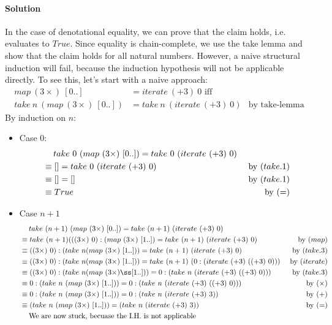 \documentclass{article}[10pt]
\begin{document}
    \paragraph{Solution}
    In the case of denotational equality, we can prove that the claim holds, i.e. evaluates to $True$.
    Since equality is chain-complete, we use the take lemma and show that the claim holds for all
    natural numbers. However, a naive structural induction will fail, because the induction hypothesis
    will not be applicable directly. To see this, let's start with a naive approach:
    \begin{align*}
      map\ (3 \times)\ [0 .. ] &= iterate\ (+3)\ 0 \text{ iff }\\
      take\ n\ (map\ (3 \times)\ [0..]) &= take\ n\ (iterate\ (+3)\ 0) &\text{by take-lemma}
    \end{align*}
    By induction on $n$:
    \begin{itemize}
      \item Case $0$:
      \begin{align*}
        &\mathbin{\hphantom{\equiv}}take\ 0\ (map\ (3 \times)\ [0..]) = take\ 0\ (iterate\ (+3)\ 0)\\
        &\equiv []                                                    = take\ 0\ (iterate\ (+3)\ 0) &\text{ by }(take.1)\\
        &\equiv []                                                    = []                          &\text{ by }(take.1)\\
        &\equiv True &\text{ by }(=)\\
      \end{align*}
      \item Case $n+1$
      \begin{align*}
        &\mathbin{\hphantom{\equiv}}take\ (n+1)\ (map\ (3 \times)\ [0..]) = take\ (n+1)\ (iterate\ (+3)\ 0)\\
        &\equiv take\ (n+1) (((3 \times)\ 0) : (map\ (3 \times)\ [1..]) =  take\ (n+1)\ (iterate\ (+3)\ 0) &\text{ by }(map)\\
        &\equiv ((3 \times)\ 0) : (take\ n (map\ (3 \times)\ [1..])) = take\ (n+1)\ (iterate\ (+3)\ 0) &\text{ by }(take.3)\\
        &\equiv ((3 \times)\ 0) : (take\ n (map\ (3 \times)\ [1..])) = take\ (n+1)\ (0 : (iterate\ (+3)\ ((+3)\ 0))) &\text{ by }(iterate)\\
        &\equiv ((3 \times)\ 0) : (take\ n (map\ (3 \times)ß [1..])) = 0 : (take\ n\ (iterate\ (+3)\ ((+3)\ 0))) &\text{ by }(take.3)\\
        &\equiv 0 : (take\ n\ (map\ (3 \times)\ [1..])) = 0 : (take\ n\ (iterate\ (+3)\ ((+3)\ 0))) &\text{ by }(\times)\\
        &\equiv 0 : (take\ n\ (map\ (3 \times)\ [1..])) = 0 : (take\ n\ (iterate\ (+3)\ 3)) &\text{ by }(+)\\
        &\equiv (take\ n\ (map\ (3 \times)\ [1..])) = (take\ n\ (iterate\ (+3)\ 3)) &\text{ by }(=)\\
        &\mathbin{\hphantom{\equiv}} \text{We are now stuck, becuase the I.H. is not applicable}
      \end{align*}
    \end{itemize}
\end{document}
